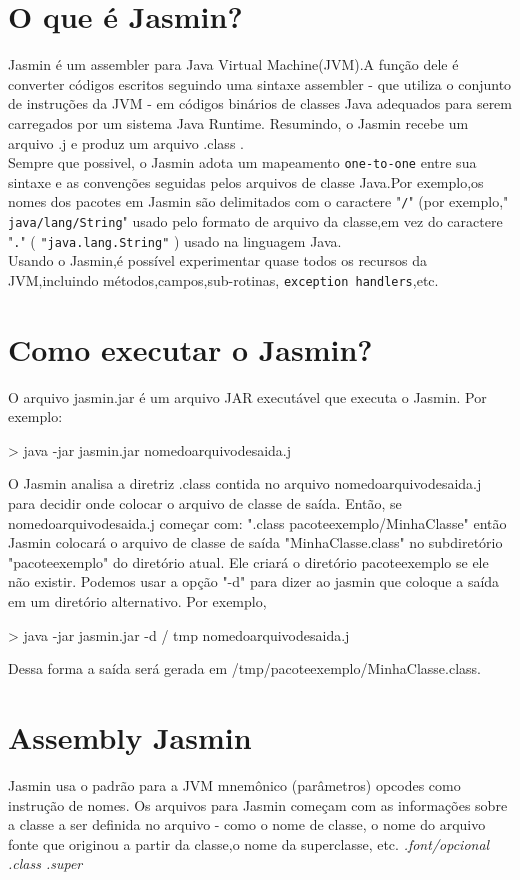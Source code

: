 \documentclass[12pt,a4paper,twoside]{report}
\begin{document}
\section{O que é Jasmin?}
 Jasmin é um assembler para Java Virtual Machine(JVM).A função dele é converter códigos escritos seguindo uma sintaxe assembler - que utiliza o conjunto de instruções da JVM - em códigos binários de classes Java adequados para serem carregados por um sistema Java Runtime. Resumindo, o Jasmin recebe um arquivo .j e produz um arquivo .class .\\
Sempre que possivel, o Jasmin adota um mapeamento   \texttt{one-to-one} entre sua sintaxe e as convenções seguidas pelos arquivos de classe Java.Por exemplo,os nomes dos pacotes em Jasmin são delimitados com o caractere   "\texttt{/}"  (por exemplo," \texttt{java/lang/String}" usado pelo formato de arquivo da classe,em vez do caractere   "\texttt{.}" (  \texttt{"java.lang.String"} )  usado na linguagem Java.\\ Usando o Jasmin,é possível experimentar quase todos os recursos da JVM,incluindo métodos,campos,sub-rotinas, \texttt{exception handlers},etc.
\section{Como executar o Jasmin?}
O arquivo jasmin.jar é um arquivo JAR executável que executa o Jasmin. Por exemplo:
\begin{terminal}
>   java -jar jasmin.jar nomedoarquivodesaida.j 
\end{terminal}
O Jasmin analisa a diretriz .class contida no arquivo nomedoarquivodesaida.j  para decidir onde colocar o arquivo de classe de saída. Então, se nomedoarquivodesaida.j  começar com:     ".class pacoteexemplo/MinhaClasse"
então Jasmin colocará o arquivo de classe de saída "MinhaClasse.class" no subdiretório "pacoteexemplo" do diretório atual. Ele criará o diretório pacoteexemplo se ele não existir.
Podemos  usar a opção "-d" para dizer ao jasmin que coloque a saída em um diretório alternativo. Por exemplo,
\begin{terminal}
>   java -jar jasmin.jar -d / tmp nomedoarquivodesaida.j 
\end{terminal}
Dessa forma a saída será gerada em /tmp/pacoteexemplo/MinhaClasse.class.


\section{Assembly Jasmin}
Jasmin usa o padrão para a JVM mnemônico (parâmetros) opcodes como instrução de nomes.
Os arquivos para Jasmin começam com as informações sobre a classe a ser definida no arquivo
- como o nome de classe, o nome do arquivo fonte que originou a partir da classe,o nome da
superclasse, etc.
 \textit{.font/opcional .class .super}
\end{document}
